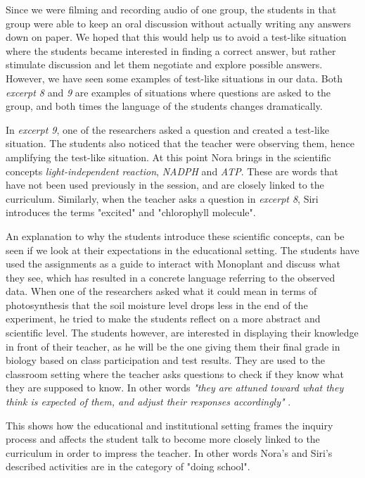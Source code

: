 Since we were filming and recording audio of one group, the students in that group were able to keep an oral discussion without actually writing any answers down on paper. We hoped that this would help us to avoid a test-like situation where the students became interested in finding a correct answer, but rather stimulate discussion and let them negotiate and explore possible answers. However, we have seen some examples of test-like situations in our data. Both \emph{excerpt 8} and \emph{9} are examples of situations where questions are asked to the group, and both times the language of the students changes dramatically. 

In \emph{excerpt 9}, one of the researchers asked a question and created a test-like situation. The students also noticed that the teacher were observing them, hence amplifying the test-like situation. At this point Nora brings in the scientific concepts \emph{light-independent reaction}, \emph{NADPH} and \emph{ATP}. These are words that have not been used previously in the session, and are closely linked to the curriculum. Similarly, when the teacher asks a question in \emph{excerpt 8}, Siri introduces the terms "excited" and "chlorophyll molecule".

An explanation to why the students introduce these scientific concepts, can be seen if we look at their expectations in the educational setting. The students have used the assignments as a guide to interact with Monoplant and discuss what they see, which has resulted in a concrete language referring to the observed data. When one of the researchers asked what it could mean in terms of photosynthesis that the soil moisture level drops less in the end of the experiment, he tried to make the students reflect on a more abstract and scientific level. The students however, are interested in displaying their knowledge in front of their teacher, as he will be the one giving them their final grade in biology based on class participation and test results. They are used to the classroom setting where the teacher asks questions to check if they know what they are supposed to know. In other words \emph{"they are attuned toward what they think is expected of them, and adjust their responses accordingly"} \citep{furberg2009socio}. 

This shows how the educational and institutional setting frames the inquiry process and affects the student talk to become more closely linked to the curriculum in order to impress the teacher. In other words Nora's and Siri's described activities are in the category of "doing school".


